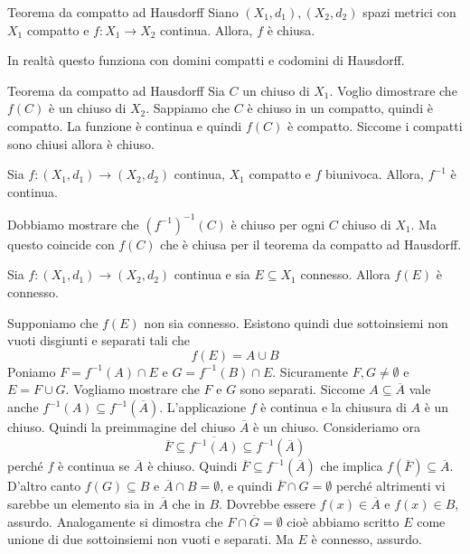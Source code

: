 \documentclass[a4paper]{article}
\begin{document}
\begin{snippettheorem}{Teorema da compatto ad Hausdorff}
    Siano \((X_1, d_1), (X_2, d_2)\) spazi metrici
    con \(X_1\) compatto e \(f \colon X_1 \to X_2\) continua.
    Allora, \(f\) è chiusa.
\end{snippettheorem}

In realtà questo funziona con domini compatti e codomini di Hausdorff.

\begin{snippetproof}{Teorema da compatto ad Hausdorff}
    Sia \(C\) un chiuso di \(X_1\).
    Voglio dimostrare che \(f(C)\) è un chiuso di \(X_2\).
    Sappiamo che \(C\) è chiuso in un compatto, quindi è compatto.
    La funzione è continua e quindi \(f(C)\) è compatto.
    Siccome i compatti sono chiusi allora è chiuso.
\end{snippetproof}

\begin{snippetcorollary}{}
    Sia \(f \colon (X_1, d_1) \to (X_2, d_2)\) continua, \(X_1\) compatto e
    \(f\) biunivoca. Allora, \(f^{-1}\) è continua.
\end{snippetcorollary}

\begin{snippetproof}{}
    Dobbiamo mostrare che \((f^{-1})^{-1}(C)\) è chiuso per ogni \(C\) chiuso di \(X_1\).
    Ma questo coincide con \(f(C)\) che è chiusa per il teorema da compatto ad Hausdorff.
\end{snippetproof}

\begin{snippettheorem}{}
    Sia \(f\colon (X_1, d_1) \to (X_2, d_2)\) continua e sia \(E \subseteq X_1\) connesso.
    Allora \(f(E)\) è connesso.
\end{snippettheorem}

\begin{snippetproof}{}
    Supponiamo che \(f(E)\) non sia connesso. Esistono quindi
    due sottoinsiemi non vuoti disgiunti e separati tali che
    \[
        f(E) = A \cup B
    \]
    Poniamo \(F = f^{-1}(A) \cap E\) e \(G = f^{-1}(B) \cap E\).
    Sicuramente \(F,G \neq \emptyset\) e \(E = F\cup G\). Vogliamo mostrare che \(F\) e \(G\)
    sono separati.
    Siccome \(A \subseteq \overline{A}\) vale anche \(f^{-1}(A) \subseteq f^{-1}(\overline{A})\).
    L'applicazione \(f\) è continua e la chiusura di \(A\) è un chiuso.
    Quindi la preimmagine del chiuso \(\overline{A}\) è un chiuso.
    Consideriamo ora \[\overline{F} \subseteq \overline{f^{-1}(A)} \subseteq f^{-1}(\overline{A})\]
    perché \(f\) è continua se \(\overline{A}\) è chiuso.
    Quindi \(\overline{F} \subseteq f^{-1}(\overline{A})\) che implica
    \(f(\overline{F}) \subseteq \overline{A}\). D'altro canto \(f(G) \subseteq B\)
    e \(\overline{A} \cap B = \emptyset\), e quindi \(\overline{F} \cap G = \emptyset\)
    perché altrimenti vi sarebbe un elemento sia in \(\overline{A}\) che in \(B\).
    Dovrebbe essere \(f(x) \in \overline{A}\) e \(f(x) \in B\), assurdo.
    Analogamente si dimostra che \(F \cap \overline{G} = \emptyset\)
    cioè abbiamo scritto \(E\) come unione di due sottoinsiemi non vuoti e separati.
    Ma \(E\) è connesso, assurdo.
\end{snippetproof}
\end{document}
